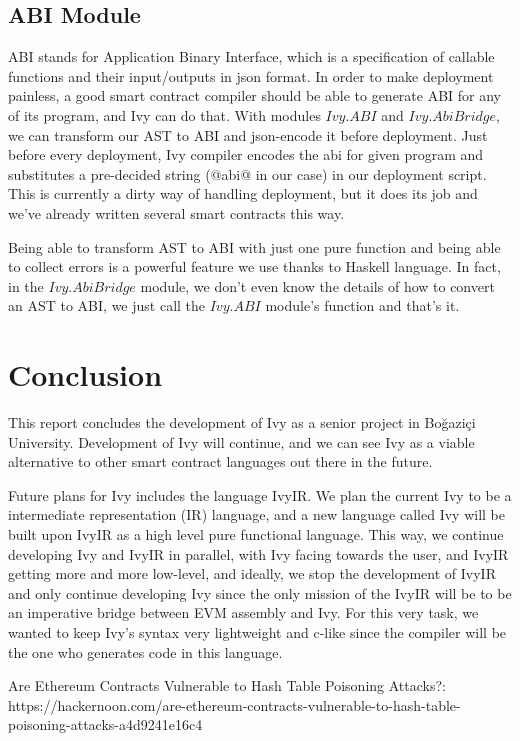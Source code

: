 \documentclass{article}
\begin{document}
\subsection{ABI Module}
\label{abi-module}
ABI stands for Application Binary Interface, which is a specification of callable functions and their input/outputs in json format. In order to make deployment painless, a good smart contract compiler should be able to generate ABI for any of its program, and Ivy can do that. With modules $Ivy.ABI$ and $Ivy.AbiBridge$, we can transform our AST to ABI and json-encode it before deployment. Just before every deployment, Ivy compiler encodes the abi for given program and substitutes a pre-decided string (@abi@ in our case) in our deployment script. This is currently a dirty way of handling deployment, but it does its job and we've already written several smart contracts this way.
\par Being able to transform AST to ABI with just one pure function and being able to collect errors is a powerful feature we use thanks to Haskell language. In fact, in the $Ivy.AbiBridge$ module, we don't even know the details of how to convert an AST to ABI, we just call the $Ivy.ABI$ module's function and that's it.

\newpage

\section{Conclusion}
This report concludes the development of Ivy as a senior project in Boğaziçi University. Development of Ivy will continue, and we can see Ivy as a viable alternative to other smart contract languages out there in the future.
\par Future plans for Ivy includes the language IvyIR. We plan the current Ivy to be a intermediate representation (IR) language, and a new language called Ivy will be built upon IvyIR as a high level pure functional language. This way, we continue developing Ivy and IvyIR in parallel, with Ivy facing towards the user, and IvyIR getting more and more low-level, and ideally, we stop the development of IvyIR and only continue developing Ivy since the only mission of the IvyIR will be to be an imperative bridge between EVM assembly and Ivy. For this very task, we wanted to keep Ivy's syntax very lightweight and c-like since the compiler will be the one who generates code in this language.
\newpage
\begin{thebibliography}{2}
  Are Ethereum Contracts Vulnerable to Hash Table Poisoning Attacks?: https://hackernoon.com/are-ethereum-contracts-vulnerable-to-hash-table-poisoning-attacks-a4d9241e16c4
\end{thebibliography}
\end{document}
